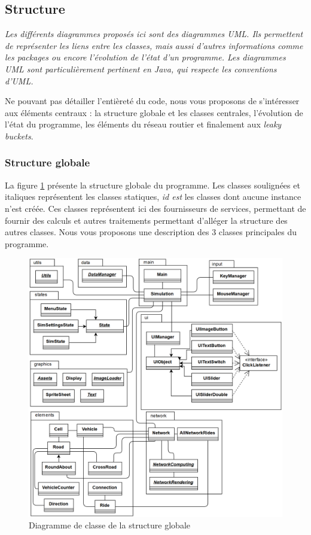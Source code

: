 \documentclass[a4paper,11pt, titlepage]{extarticle}
\begin{document}
\subsection{Structure}

\emph{Les différents diagrammes proposés ici sont des diagrammes UML. Ils permettent de représenter les liens entre les classes, mais aussi d'autres informations comme les packages ou encore l'évolution de l'état d'un programme. Les diagrammes UML sont particulièrement pertinent en Java, qui respecte les conventions d'UML.}

Ne pouvant pas détailler l'entièreté du code, nous vous proposons de s'intéresser aux éléments centraux : la structure globale et les classes centrales, l'évolution de l'état du programme, les éléments du réseau routier et finalement aux \emph{leaky buckets}.

\subsubsection{Structure globale}

La figure \ref{imgGlobal} présente la structure globale du programme. Les classes soulignées et italiques représentent les classes statiques, \emph{id est} les classes dont aucune instance n'est créée. Ces classes représentent ici des fournisseurs de services, permettant de fournir des calculs et autres traitements permettant d'alléger la structure des autres classes. Nous vous proposons une description des 3 classes principales du programme.

\begin{figure}[!h]
\begin{center}
\includegraphics[width=15cm]{global_class_diagram.png}
\caption{Diagramme de classe de la structure globale}
\label{imgGlobal}
\end{center}
\end{figure}
\end{document}
